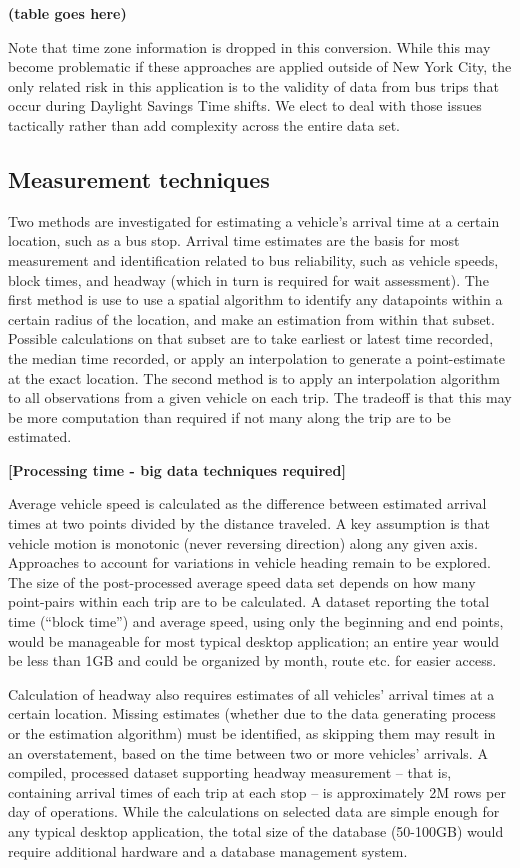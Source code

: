 \documentclass[12pt]{report}
\begin{document}
\textbf{(table goes here)}

Note that time zone information is dropped in this conversion.  While this may become problematic if these approaches are applied outside of New York City, the only related risk in this application is to the validity of data from bus trips that occur during Daylight Savings Time shifts.  We elect to deal with those issues tactically rather than add complexity across the entire data set.

\subsection{Measurement techniques}

Two methods are investigated for estimating a vehicle's arrival time at a certain location, such as a bus stop.  Arrival time estimates are the basis for most measurement and identification related to bus reliability, such as vehicle speeds, block times, and headway (which in turn is required for wait assessment).  The first method is use to use a spatial algorithm to identify any datapoints within a certain radius of the location, and make an estimation from within that subset.  Possible calculations on that subset are to take earliest or latest time recorded, the median time recorded, or apply an interpolation to generate a point-estimate at the exact location.  The second method is to apply an interpolation algorithm to all observations from a given vehicle on each trip.  The tradeoff is that this may be more computation than required if not many along the trip are to be estimated.

\textbf{[Processing time - big data techniques required]}


Average vehicle speed is calculated as the difference between estimated arrival times at two points divided by the distance traveled.  A key assumption is that vehicle motion is monotonic (never reversing direction) along any given axis.  Approaches to account for variations in vehicle heading remain to be explored.  The size of the post-processed average speed data set depends on how many point-pairs within each trip are to be calculated.  A dataset reporting the total time (“block time'') and average speed, using only the beginning and end points, would be manageable for most typical desktop application; an entire year would be less than 1GB and could be organized by month, route etc. for easier access.

Calculation of headway also requires estimates of all vehicles' arrival times at a certain location.  Missing estimates (whether due to the data generating process or the estimation algorithm) must be identified, as skipping them may result in an overstatement, based on the time between two or more vehicles' arrivals.  A compiled, processed dataset supporting headway measurement -- that is, containing arrival times of each trip at each stop -- is approximately 2M rows per day of operations.  While the calculations on selected data are simple enough for any typical desktop application, the total size of the database (50-100GB) would require additional hardware and a database management system.
\end{document}
